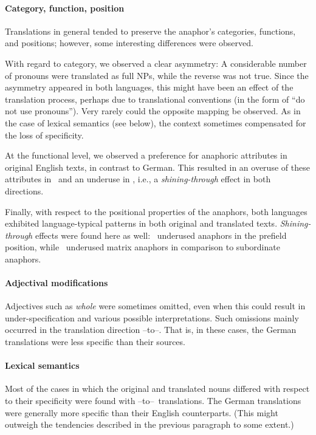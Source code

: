 \documentclass[output=paper]{LSP/langsci}
\begin{document}
\paragraph*{Category, function, position}

Translations in general tended to preserve the anaphor's categories, functions, and positions; however, some interesting differences were observed.

With regard to category, we observed a clear asymmetry: A considerable number of pronouns were translated as full NPs, while the reverse was not true. Since the asymmetry appeared in both languages, this might have been an effect of the translation process, perhaps due to translational conventions (in the form of ``do not use pronouns''). Very rarely could the opposite mapping be observed. As in the case of lexical semantics (see below), the context sometimes compensated for the loss of specificity.

At the functional level, we observed a preference for anaphoric attributes in original English texts, in contrast to German. This resulted in an overuse of these attributes in \DEt\ and an underuse in \ENt, i.e., a \emph{shining-through} effect in both directions.

Finally, with respect to the positional properties of the anaphors, both languages exhibited language-typical patterns in both original and translated texts. \emph{Shining-through} effects were found here as well: \DEt\ underused anaphors in the prefield position, while \ENt\ underused matrix anaphors in comparison to subordinate anaphors.

\paragraph*{Adjectival modifications} Adjectives such as \textit{whole} were sometimes omitted, even when this could result in under-specification and various possible interpretations. Such omissions mainly occurred in the translation direction \ENo--to--\DEt. That is, in these cases, the German translations were less specific than their sources.

\paragraph*{Lexical semantics} Most of the cases in which the original and translated nouns differed with respect to their specificity were found with \ENo--to--\DEt \ translations. The German translations were generally more specific than their English counterparts. (This might outweigh the tendencies described in the previous paragraph to some extent.)
\end{document}
